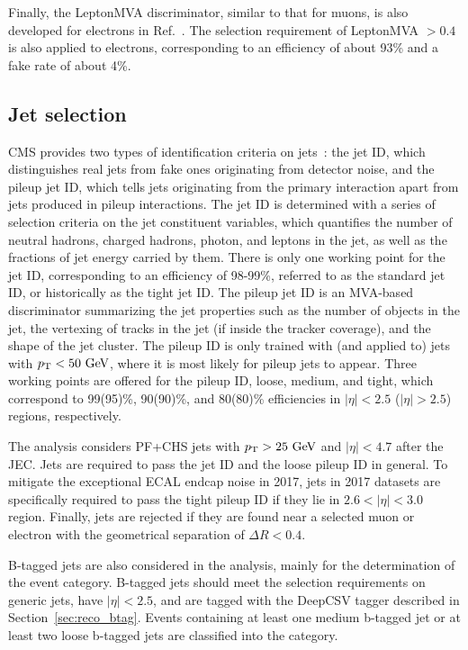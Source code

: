 Finally, the LeptonMVA discriminator, similar to that for muons, is also developed for electrons in Ref.~\cite{PhysRevLett.122.132003}. 
The selection requirement of LeptonMVA $> 0.4$ is also applied to electrons, 
corresponding to an efficiency of about 93\% and a fake rate of about 4\%.

\subsection{Jet selection}\label{sec:sel_jet}

CMS provides two types of identification criteria on jets~\cite{Sirunyan_2020}: the jet ID, which distinguishes real jets from fake ones originating from detector noise,
and the pileup jet ID, which tells jets originating from the primary interaction apart from jets produced in pileup interactions.
The jet ID is determined with a series of selection criteria on the jet constituent variables,
which quantifies the number of neutral hadrons, charged hadrons, photon, and leptons in the jet, 
as well as the fractions of jet energy carried by them.
There is only one working point for the jet ID, corresponding to an efficiency of 98-99\%, referred to as the standard jet ID, or historically as the tight jet ID.
The pileup jet ID is an MVA-based discriminator summarizing the jet properties such as the number of objects in the jet, 
the vertexing of tracks in the jet (if inside the tracker coverage), and the shape of the jet cluster.
The pileup ID is only trained with (and applied to) jets with $p_{\mathrm{T}} < 50~\mbox{GeV}$, where it is most likely for pileup jets to appear.
Three working points are offered for the pileup ID, loose, medium, and tight, 
which correspond to 99(95)\%, 90(90)\%, and 80(80)\% efficiencies in $|\eta| < 2.5$ ($|\eta| > 2.5$) regions, respectively.

The \hmm analysis considers PF+CHS jets with $p_{\mathrm{T}} > 25~\mbox{GeV}$ and $|\eta| < 4.7$ after the JEC. 
Jets are required to pass the jet ID and the loose pileup ID in general.
To mitigate the exceptional ECAL endcap noise in 2017,
jets in 2017 datasets are specifically required to pass the tight pileup ID if they lie in $2.6 < |\eta| < 3.0$ region.
Finally, jets are rejected if they are found near a selected muon or electron with the geometrical separation of $\Delta{}R < 0.4$.

B-tagged jets are also considered in the \hmm analysis, mainly for the determination of the \ttH event category.
B-tagged jets should meet the selection requirements on generic jets, have $|\eta| < 2.5$, and are tagged with the DeepCSV tagger described in Section~\ref{sec:reco_btag}.
Events containing at least one medium b-tagged jet or at least two loose b-tagged jets are classified into the \ttH category.